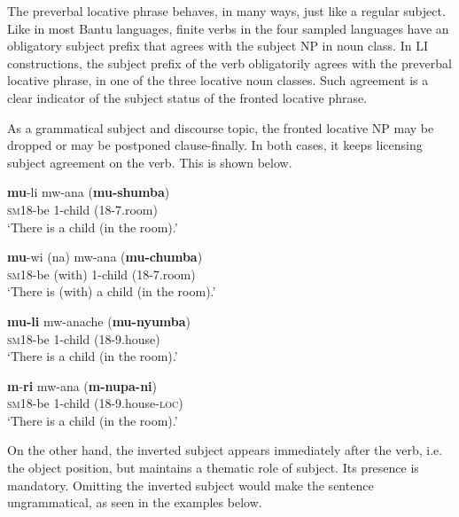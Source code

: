 \documentclass[output=paper ]{langscibook}
\begin{document}
The preverbal locative phrase behaves, in many ways, just like a regular subject. Like in most Bantu languages, finite verbs in the four sampled languages have an obligatory subject prefix that agrees with the subject NP in noun class. In LI constructions, the subject prefix of the verb obligatorily agrees with the preverbal locative phrase, in one of the three locative noun classes. Such agreement is a clear indicator of the subject status of the fronted locative phrase. 

As a grammatical subject and discourse topic, the fronted locative NP may be dropped or may be postponed clause-finally. In both cases, it keeps licensing subject agreement on the verb. This is shown below.


\ea \label{ex:mapunda:26}
\gll \textbf{mu}{}-li    mw-ana   (\textbf{mu-shumba})\\   
\textsc{sm18}{}-be    1-child    (18-7.room)\\ \jambox*{[Bena]}
\glt ‘There is a child (in the room).’


\ex\label{ex:mapunda:27}
\gll \textbf{mu}{}-wi       (na)  mw-ana (\textbf{mu-chumba})\\   
\textsc{sm18}{}-be    (with)  1-child    (18-7.room)  \\\jambox*{[Ngoni]}
\glt ‘There is (with)  a child (in the room).’


\ex \label{ex:mapunda:28}
\gll \textbf{mu-li}    mw-anache (\textbf{mu-nyumba})\\   
\textsc{sm18}{}-be    1-child    (18-9.house)  \\\jambox*{[Yao]}
\glt ‘There is a child (in the room).’


\ex \label{ex:mapunda:29}
\gll \textbf{m}{}-\textbf{ri}    mw-ana (\textbf{m-nupa-ni})    \\ 
\textsc{sm18}{}-be    1-child    (18-9.house-\textsc{loc)}    \\\jambox*{[Makhuwa]}
\glt ‘There is a child (in the room).’
\z

On the other hand, the inverted subject appears immediately after the verb, i.e. the object position, but maintains a thematic role of subject. Its presence is mandatory. Omitting the inverted subject would make the sentence ungrammatical, as seen in the examples below. 


\end{document}
